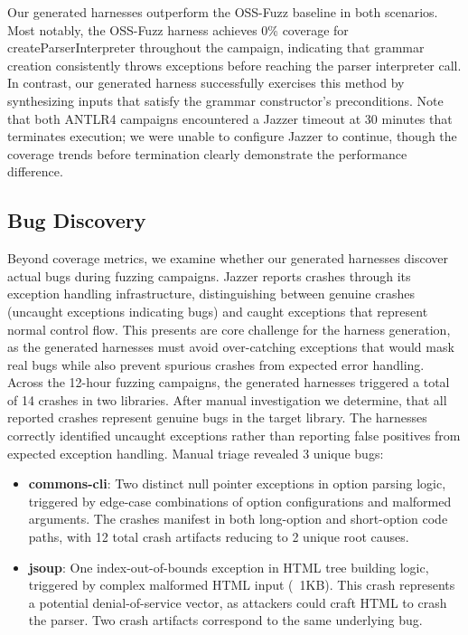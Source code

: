 Our generated harnesses outperform the OSS-Fuzz baseline in both scenarios. Most notably, the OSS-Fuzz harness achieves 0\% coverage for createParserInterpreter throughout the campaign, indicating that grammar creation consistently throws exceptions before reaching the parser interpreter call. In contrast, our generated harness successfully exercises this method by synthesizing inputs that satisfy the grammar constructor's preconditions. Note that both ANTLR4 campaigns encountered a Jazzer timeout at 30 minutes that terminates execution; we were unable to configure Jazzer to continue, though the coverage trends before termination clearly demonstrate the performance difference.
%
\subsection{Bug Discovery}%
\label{subsec:bug-discovery}
Beyond coverage metrics, we examine whether our generated harnesses discover actual bugs during fuzzing campaigns. Jazzer reports crashes through its exception handling infrastructure, distinguishing between genuine crashes (uncaught exceptions indicating bugs) and caught exceptions that represent normal control flow. This presents are core challenge for the harness generation, as the generated harnesses must avoid over-catching exceptions that would mask real bugs while also prevent spurious crashes from expected error handling.
Across the 12-hour fuzzing campaigns, the generated harnesses triggered a total of 14 crashes in two libraries. After manual investigation we determine, that all reported crashes represent genuine bugs in the target library. The harnesses correctly identified uncaught exceptions rather than reporting false positives from expected exception handling. Manual triage revealed 3 unique bugs:

\begin{itemize}
\item \textbf{commons-cli}: Two distinct null pointer exceptions in option parsing logic, triggered by edge-case combinations of option configurations and malformed arguments. The crashes manifest in both long-option and short-option code paths, with 12 total crash artifacts reducing to 2 unique root causes.
\item \textbf{jsoup}: One index-out-of-bounds exception in HTML tree building logic, triggered by complex malformed HTML input (~1KB). This crash represents a potential denial-of-service vector, as attackers could craft HTML to crash the parser. Two crash artifacts correspond to the same underlying bug.
\end{itemize}

